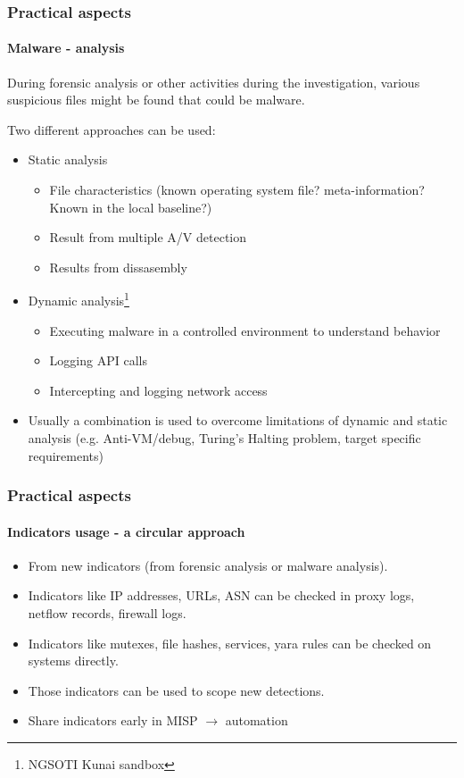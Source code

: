 \begin{frame}[fragile]
\frametitle{Practical aspects}
\framesubtitle{Malware - analysis}
During forensic analysis or other activities during the investigation, various suspicious files might be found that could be malware.

Two different approaches can be used:
\begin{itemize}
        \item Static analysis
                \begin{itemize}
                        \item File characteristics (known operating system file? meta-information? Known in the local baseline?)
                        \item Result from multiple A/V detection
                        \item Results from dissasembly
                \end{itemize}
        \item Dynamic analysis\footnote{NGSOTI Kunai sandbox}
                \begin{itemize}
                        \item Executing malware in a controlled environment to understand  behavior 
                        \item Logging API calls
                        \item Intercepting and logging network access
                \end{itemize}
        \item Usually a combination is used to overcome limitations of dynamic and static analysis (e.g. Anti-VM/debug, Turing's Halting problem, target specific requirements)
\end{itemize}
\end{frame}


\begin{frame}[fragile]
\frametitle{Practical aspects}
\framesubtitle{Indicators usage - a circular approach}
\begin{itemize}
        \item From new indicators (from forensic analysis or malware analysis).
        \item Indicators like IP addresses, URLs, ASN can be checked in proxy logs, netflow records, firewall logs.
        \item Indicators like mutexes, file hashes, services, yara rules can be checked on systems directly.
        \item Those indicators can be used to scope new detections.
        \item Share indicators early in MISP $\to$ automation
\end{itemize}
\end{frame}


